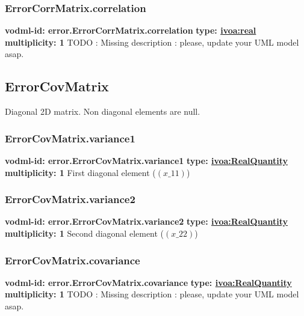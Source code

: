     \subsubsection{ErrorCorrMatrix.correlation}
      \textbf{vodml-id: error.ErrorCorrMatrix.correlation} \newline
      \textbf{type: \hyperref[sect:ivoa]{ivoa:real}} \newline
      \textbf{multiplicity: 1} \newline
      TODO : Missing description : please, update your UML model asap.

  \subsection{ErrorCovMatrix}
  \label{sect:error.ErrorCovMatrix}
    Diagonal 2D matrix. Non diagonal elements are null.

    \subsubsection{ErrorCovMatrix.variance1}
      \textbf{vodml-id: error.ErrorCovMatrix.variance1} \newline
      \textbf{type: \hyperref[sect:ivoa]{ivoa:RealQuantity}} \newline
      \textbf{multiplicity: 1} \newline
      First diagonal element ($(x\_11)$)

    \subsubsection{ErrorCovMatrix.variance2}
      \textbf{vodml-id: error.ErrorCovMatrix.variance2} \newline
      \textbf{type: \hyperref[sect:ivoa]{ivoa:RealQuantity}} \newline
      \textbf{multiplicity: 1} \newline
      Second diagonal element ($(x\_22)$)

    \subsubsection{ErrorCovMatrix.covariance}
      \textbf{vodml-id: error.ErrorCovMatrix.covariance} \newline
      \textbf{type: \hyperref[sect:ivoa]{ivoa:RealQuantity}} \newline
      \textbf{multiplicity: 1} \newline
      TODO : Missing description : please, update your UML model asap.

